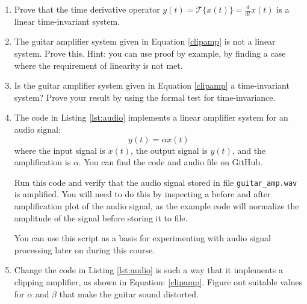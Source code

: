 \begin{enumerate}
\item Prove that the time derivative operator $y(t) = \mathcal{T}\{x(t)\} = \frac{d}{dt} x(t)$
is a linear time-invariant system.

\item The guitar amplifier system given in Equation \ref{clipamp} is not a linear system. Prove this. Hint: you can use proof by example, by finding a case where the requirement of linearity is not met. 

\item Is the guitar amplifier system given in Equation \ref{clipamp} a time-invariant system? Prove your result by using the formal test for time-invariance.

\item The code in Listing \ref{lst:audio} implements a linear amplifier system for an audio signal:
\begin{equation}
y(t) = \alpha x(t)
\end{equation}
where the input signal is $x(t)$, the output signal is $y(t)$, and the amplification is $\alpha$. You can find the code and audio file on GitHub.

Run this code and verify that the audio signal stored in
file \verb|guitar_amp.wav| is amplified. You will need to do this by inspecting a before and after amplification plot of the audio signal, as the example code will normalize the amplitude of the signal before storing it to file.

You can use this script as a basis for experimenting with audio signal processing later on during this course.

\item Change the code in Listing \ref{lst:audio} is such a way that it implements a clipping amplifier, as shown in Equation: \ref{clipamp}. 
Figure out suitable values for $\alpha$ and $\beta$ that make the guitar sound distorted.

\end{enumerate}
